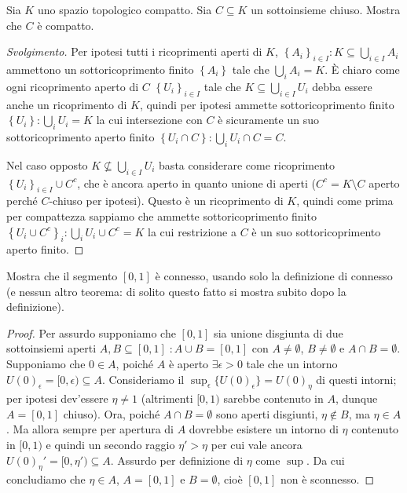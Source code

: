 \documentclass[a4paper, 12pt, italian]{article}
\begin{document}
\begin{exercise}
Sia $K$ uno spazio topologico compatto. Sia $C \subseteq K$ un sottoinsieme
chiuso. Mostra che $C$ è compatto.
\begin{proof}[Svolgimento]
Per ipotesi tutti i ricoprimenti aperti di $K$, $\left\{A_i\right\}_{i \in I} : K \subseteq \bigcup_{i \in I} A_i$ ammettono un sottoricoprimento
finito $\left\{A_i\right\}$ tale che $\bigcup_i A_i = K$.
\`E chiaro come ogni ricoprimento aperto di $C$ $\left\{U_i\right\}_{i \in I}$
tale che $K \subseteq \bigcup_{i \in I} U_i$ debba essere anche un
ricoprimento di $K$, quindi per ipotesi ammette sottoricoprimento finito
$\left\{U_i\right\} : \bigcup_i U_i = K$ la cui intersezione con $C$ è
sicuramente un suo sottoricoprimento aperto finito
$\left\{U_i \cap C\right\} : \bigcup_i U_i \cap C = C$.

Nel caso opposto $K \nsubseteq \bigcup_{i \in I} U_i$ basta considerare
come ricoprimento $\left\{U_i \right\}_{i \in I} \cup C^c$, che è
ancora aperto in quanto unione di aperti ($C^c = K \setminus C$ aperto perché
$C$-chiuso per ipotesi). Questo è un ricoprimento di $K$, quindi come prima
per compattezza sappiamo che ammette sottoricoprimento finito
$\left\{U_i \cup C^c \right\}_i :  \bigcup_i U_i \cup C^c =K$ la cui
restrizione a $C$ è un suo sottoricoprimento aperto finito.

\iffalse
Considerando solo spazi topologici nello spazio euclideo $\R^n$:
Per il Teorema di Heine-Borel $K$ è compatto $\iff$ $K$ è chiuso e limitato.
$C \subseteq K$ è sottoinsieme di un insieme limitato, quindi è limitato.
Per ipotesi $C$ è chiuso, quindi è anche compatto.
\fi
\end{proof}
\end{exercise}

\begin{exercise}
Mostra che il segmento $[0, 1]$ è connesso, usando solo la definizione di
connesso (e nessun altro teorema: di solito questo fatto si mostra subito dopo
la definizione).
\begin{proof}
Per assurdo supponiamo che $[0, 1]$ sia unione disgiunta di due sottoinsiemi
aperti $A, B \subseteq [0, 1] \; : A \cup B = [0, 1]$ con
$A \neq \emptyset$, $B \neq \emptyset$ e $A \cap B = \emptyset$.
Supponiamo che $0 \in A$, poiché $A$ è aperto $\exists \epsilon > 0$
tale che un intorno $U(0)_\epsilon = [0, \epsilon) \subseteq A$.
Consideriamo il $\sup_\epsilon \{U(0)_\epsilon\} = U(0)_\eta$ di questi
intorni; per ipotesi dev'essere $\eta \neq 1$ (altrimenti $[0, 1)$ sarebbe
contenuto in $A$, dunque $A = [0, 1]$ chiuso). Ora, poiché 
$A \cap B = \emptyset$ sono aperti disgiunti, $\eta \not\in B$, ma
$\eta \in A$. Ma allora sempre per apertura di $A$ dovrebbe esistere un
intorno di $\eta$ contenuto in $[0, 1)$ e quindi un secondo raggio 
$\eta' > \eta$ per cui vale ancora $U(0)_\eta' = [0, \eta') \subseteq A$.
Assurdo per definizione di $\eta$ come $\sup$. Da cui concludiamo che
$\eta \in A$, $A = [0, 1]$ e $B = \emptyset$, cioè $[0, 1]$ non è
sconnesso.

\end{proof}
\end{exercise}
\end{document}
